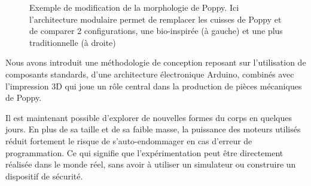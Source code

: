 \begin{figure}[!t]
\centering
    \hfil
    \caption{Exemple de modification de la morphologie de Poppy. Ici l'architecture modulaire permet de remplacer les cuisses de Poppy et de comparer 2 configurations, une bio-inspirée (à gauche) et une plus traditionnelle (à droite)}
\end{figure}

Nous avons introduit une méthodologie de conception reposant sur l'utilisation de composants standards, d'une architecture électronique Arduino, combinés avec l'impression 3D qui joue un rôle central dans la production de pièces mécaniques de Poppy.

Il est maintenant possible d'explorer de nouvelles formes du corps en quelques jours. En plus de sa taille et de sa faible masse, la puissance des moteurs utilisés réduit fortement le risque de s'auto-endommager en cas d'erreur de programmation. Ce qui signifie que l'expérimentation peut être directement réalisée dans le monde réel, sans avoir à utiliser un simulateur ou construire un dispositif de sécurité.

